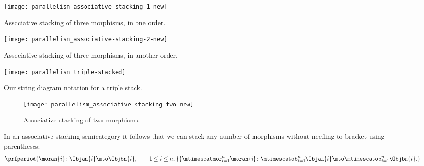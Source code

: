 \begin{marginfigure}[]
    \centering
    \texttt{[image: parallelism\_associative-stacking-1-new]}
    \caption{Associative stacking of three morphisms, in one order.}
    \label{fig:associative-stacking-1-new}
\end{marginfigure}

\begin{marginfigure}
    \centering
    \texttt{[image: parallelism\_associative-stacking-2-new]}
    \caption{Associative stacking of three morphisms, in another order.}
    \label{fig:associative-stacking-2-new}
\end{marginfigure}

\begin{marginfigure}
    \centering
    \texttt{[image: parallelism\_triple-stacked]}
    \caption{Our string diagram notation for a triple stack.}
    \label{fig:triple-stacked}
\end{marginfigure}

\begin{figure}[h!]
    \centering
    \texttt{[image: parallelism\_associative-stacking-two-new]}
    \caption{Associative stacking of two morphisms.}
    \label{fig:double-stacked-new}
\end{figure}

\begin{remark}
    In an associative stacking semicategory it follows that we can stack any number of morphisms without needing to bracket using parentheses:
    \begin{equation}
        \prfperiod{
            \moran{i} \colon \Objan{i} \mto \Objbn{i}, \qquad 1 \leq i \leq n,
        }{
            \mtimescatmor_{i=1}^n \moran{i} \colon  \mtimescatob_{i=1}^n \Objan{i} \mto \mtimescatob_{i=1}^n \Objbn{i}.
        }
    \end{equation}
\end{remark}

